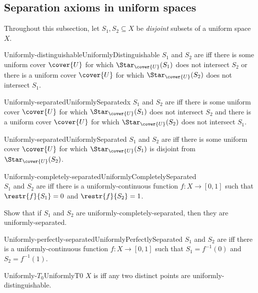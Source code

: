 \subsection{Separation axioms in uniform spaces}

Throughout this subsection, let $S_1,S_2\subseteq X$ be \emph{disjoint} subsets of a uniform space $X$.
\begin{dfn}{Uniformly-distinguishable}{UniformlyDistinguishable}
$S_1$ and $S_2$ are  iff there is some uniform cover $\cover{U}$ for which $\Star _{\cover{U}}(S_1)$ does not intersect $S_2$ or there is a uniform cover $\cover{U}$ for which $\Star _{\cover{U}}(S_2)$ does not intersect $S_1$.
\end{dfn}
\begin{dfn}{Uniformly-separated}{UniformlySeparatedx}
$S_1$ and $S_2$ are  iff there is some uniform cover $\cover{U}$ for which $\Star _{\cover{U}}(S_1)$ does not intersect $S_2$ and there is a uniform cover $\cover{U}$ for which $\Star _{\cover{U}}(S_2)$ does not intersect $S_1$.
\end{dfn}
\begin{dfn}{Uniformly-separated}{UniformlySeparated}
$S_1$ and $S_2$ are  iff there is some uniform cover $\cover{U}$ for which $\Star _{\cover{U}}(S_1)$ is disjoint from $\Star _{\cover{U}}(S_2)$.
\end{dfn}
\begin{dfn}{Uniformly-completely-separated}{UniformlyCompletelySeparated}
\\ $S_1$ and $S_2$ are  iff there is a uniformly-continuous function $f\colon X\rightarrow [0,1]$ such that $\restr{f}{S_1}=0$ and $\restr{f}{S_2}=1$.
\end{dfn}
\begin{exr}{}{}
Show that if $S_1$ and $S_2$ are uniformly-completely-separated, then they are uniformly-separated.
\end{exr}
\begin{dfn}{Uniformly-perfectly-separated}{UniformlyPerfectlySeparated}
$S_1$ and $S_2$ are  iff there is a uniformly-continuous function $f\colon X\rightarrow [0,1]$ such that $S_1=f^{-1}(0)$ and $S_2=f^{-1}(1)$.
\end{dfn}
\begin{dfn}{Uniformly-$T_0$}{UniformlyT0}
$X$ is  iff any two distinct points are uniformly-distinguishable.
\end{dfn}
